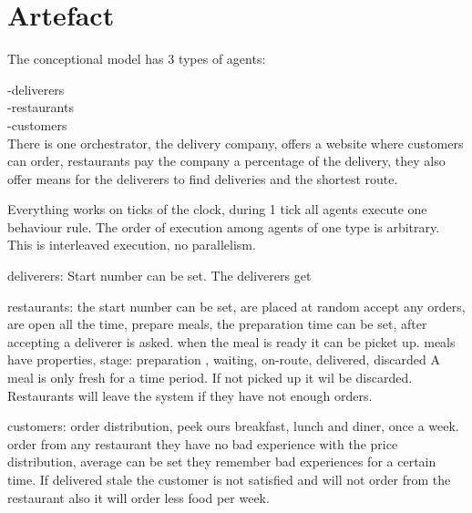 \section{Artefact}

The conceptional model has 3 types of agents:

-deliverers \\
-restaurants \\
-customers \\

There is one orchestrator, the delivery company, offers a website where customers can order,
restaurants pay the company a percentage of the delivery, they also offer means for the deliverers to
find deliveries and the shortest route.

Everything works on ticks of the clock, during 1 tick all agents execute one behaviour rule.
The order of execution among agents of one type is arbitrary.
This is interleaved execution, no parallelism.


deliverers:
Start number can be set.
The deliverers get


restaurants:
the start number can be set, are placed at random
accept any orders, are open all the time,
prepare meals, the preparation time can be set,
after accepting a deliverer is asked.
when the meal is ready it can be picket up.
meals have properties, stage: preparation , waiting, on-route, delivered, discarded
A meal is only fresh for a time period.
If not picked up it wil be discarded.
Restaurants will leave the system if they have not enough orders.

customers:
order distribution, peek ours breakfast, lunch and  diner, once a week.
order from any restaurant they have no bad experience with
the price distribution, average can be set
they remember bad experiences for a certain time.
If delivered stale the customer is not satisfied and will not order from the restaurant also
it will order less food per week.







